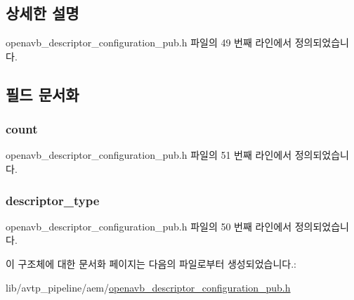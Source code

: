 \subsection{상세한 설명}


openavb\+\_\+descriptor\+\_\+configuration\+\_\+pub.\+h 파일의 49 번째 라인에서 정의되었습니다.



\subsection{필드 문서화}
\subsubsection[{\texorpdfstring{count}{count}}]{ count}\hypertarget{structopenavb__aem__descriptor__configuration__descriptor__counts__t_a0e90ee3ca6a103b4f360f92f1d1fa072}{}\label{structopenavb__aem__descriptor__configuration__descriptor__counts__t_a0e90ee3ca6a103b4f360f92f1d1fa072}


openavb\+\_\+descriptor\+\_\+configuration\+\_\+pub.\+h 파일의 51 번째 라인에서 정의되었습니다.

\subsubsection[{\texorpdfstring{descriptor\+\_\+type}{descriptor_type}}]{ descriptor\+\_\+type}\hypertarget{structopenavb__aem__descriptor__configuration__descriptor__counts__t_a1e231d7874aada5925b29affc76782cc}{}\label{structopenavb__aem__descriptor__configuration__descriptor__counts__t_a1e231d7874aada5925b29affc76782cc}


openavb\+\_\+descriptor\+\_\+configuration\+\_\+pub.\+h 파일의 50 번째 라인에서 정의되었습니다.



이 구조체에 대한 문서화 페이지는 다음의 파일로부터 생성되었습니다.\+:\begin{DoxyCompactItemize}
\item 
lib/avtp\+\_\+pipeline/aem/\hyperlink{openavb__descriptor__configuration__pub_8h}{openavb\+\_\+descriptor\+\_\+configuration\+\_\+pub.\+h}\end{DoxyCompactItemize}
